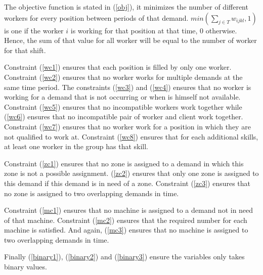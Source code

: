 \documentclass[../thesis.tex]{subfiles}
\begin{document}
The objective function is stated in (\ref{obj}), it minimizes the number of different workers for every position between periods of that demand. $min(\sum_{j \in T} w_{ijkl}, 1)$ is one if the worker $i$ is working for that position at that time, 0 otherwise. Hence, the sum of that value for all worker will be equal to the number of worker for that shift.


Constraint (\ref{wc1}) ensures that each position is filled by only one worker. Constraint (\ref{wc2}) ensures that no worker works for multiple demands at the same time period. The constraints (\ref{wc3}) and (\ref{wc4}) ensures that no worker is working for a demand that is not occurring or when is himself not available. Constraint (\ref{wc5}) ensures that no incompatible workers work together while (\ref{wc6}) ensures that no incompatible pair of worker and client work together. Constraint (\ref{wc7}) ensures that no worker work for a position in which they are not qualified to work at. 
Constraint (\ref{wc8}) ensures that for each additional skills, at least one worker in the group has that skill.

Constraint (\ref{zc1}) ensures that no zone is assigned to a demand in which this zone is not a possible assignment. (\ref{zc2}) ensures that only one zone is assigned to this demand if this demand is in need of a zone. Constraint (\ref{zc3}) ensures that no zone is assigned to two overlapping demands in time.

Constraint (\ref{mc1}) ensures that no machine is assigned to a demand not in need of that machine. Constraint (\ref{mc2}) ensures that the required number for each machine is satisfied. And again, (\ref{mc3}) ensures that no machine is assigned to two overlapping demands in time.


Finally (\ref{binary1}), (\ref{binary2}) and (\ref{binary3}) ensure the variables only takes binary values.
\end{document}
